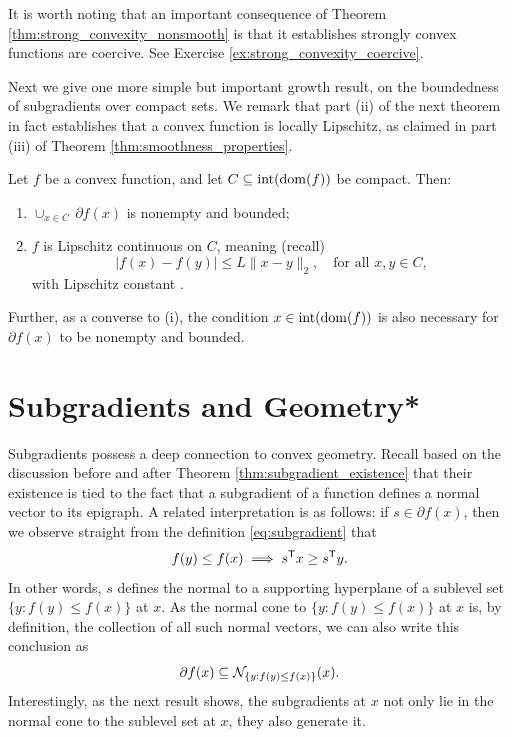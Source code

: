It is worth noting that an important consequence of Theorem
\ref{thm:strong_convexity_nonsmooth} is that it establishes strongly convex
functions are coercive. See Exercise \ref{ex:strong_convexity_coercive}.

Next we give one more simple but important growth result, on the boundedness of
subgradients over compact sets. We remark that part (ii) of the next theorem in
fact establishes that a convex function is locally Lipschitz, as claimed in part
(iii) of Theorem \ref{thm:smoothness_properties}.  

\begin{Theorem}
\label{thm:subgradient_boundedness}
Let $f$ be a convex function, and let $C \subseteq \operatorname{int}(\operatorname{dom}(f))$ be 
compact. Then:
\begin{enumerate}[label=(\roman*)]
\item $\cup_{x \in C} \, \partial f(x)$ is nonempty and bounded;  
\item $f$ is Lipschitz continuous on $C$, meaning (recall)
  \[
  |f(x) - f(y)| \leq L \|x-y\|_2, \quad \text{for all $x,y \in C$},
  \]
  with Lipschitz constant . 
\end{enumerate}
Further, as a converse to (i), the condition $x \in \operatorname{int}(\operatorname{dom}(f))$ is also 
necessary for $\partial f(x)$ to be nonempty and bounded.   
\end{Theorem}



\section{Subgradients and Geometry*}

Subgradients possess a deep connection to convex geometry. Recall based on the
discussion before and after Theorem \ref{thm:subgradient_existence} that their
existence is tied to the fact that a subgradient of a function defines a normal
vector to its epigraph. A related interpretation is as follows: if $s \in
\partial f(x)$, then we observe straight from the definition
\eqref{eq:subgradient} that
\[
f(y) \leq f(x) \implies s^{\mathsf{T}} x \geq s^{\mathsf{T}} y.
\]
In other words, $s$ defines the normal to a supporting hyperplane of a sublevel
set $\{y : f(y) \leq f(x)\}$ at $x$. As the normal cone to $\{y : f(y) \leq
f(x)\}$ at $x$ is, by definition, the collection of all such normal vectors, we
can also write this conclusion as   
\[
\partial f(x) \subseteq \mathcal{N}_{\{y : f(y) \leq f(x)\}}(x).
\]
Interestingly, as the next result shows, the subgradients at $x$ not only lie in
the normal cone to the sublevel set at $x$, they also generate it. 

